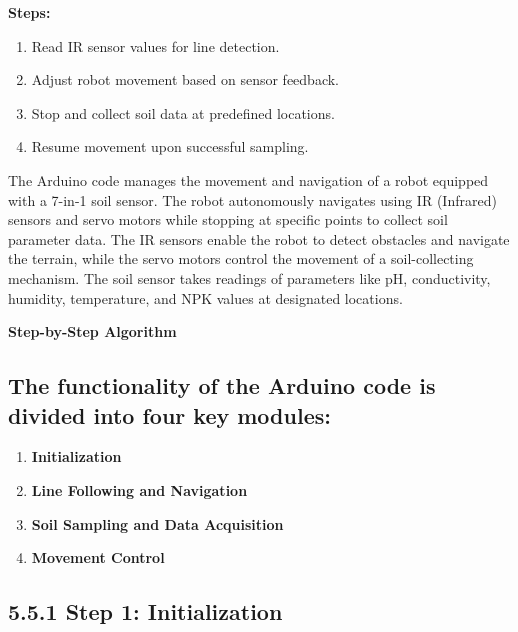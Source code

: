 \documentclass{book} %
\begin{document}
\noindent \textbf{Steps:}

\begin{enumerate}
\item \textbf{ }Read IR sensor values for line detection.

\item  Adjust robot movement based on sensor feedback.

\item  Stop and collect soil data at predefined locations.

\item  Resume movement upon successful sampling.
\end{enumerate}

\noindent The Arduino code manages the movement and navigation of a robot equipped with a 7-in-1 soil sensor. The robot autonomously navigates using IR (Infrared) sensors and servo motors while stopping at specific points to collect soil parameter data. The IR sensors enable the robot to detect obstacles and navigate the terrain, while the servo motors control the movement of a soil-collecting mechanism. The soil sensor takes readings of parameters like pH, conductivity, humidity, temperature, and NPK values at designated locations.

\noindent \textbf{Step-by-Step Algorithm}

\noindent 
\subsection{The functionality of the Arduino code is divided into four key modules:}

\begin{enumerate}
\item  \textbf{Initialization}

\item  \textbf{Line Following and Navigation}

\item  \textbf{Soil Sampling and Data Acquisition}

\item  \textbf{Movement Control}
\end{enumerate}

\noindent 
\subsection{5.5.1 Step 1: Initialization}
\end{document}
